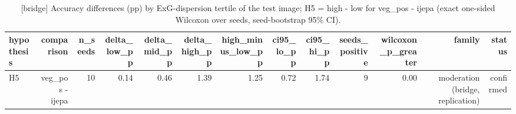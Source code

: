 \begin{table}[t]
\centering
\small
\caption{[bridge] Accuracy differences (pp) by ExG-dispersion tertile of the test image; H5 = high - low for veg\_pos - ijepa (exact one-sided Wilcoxon over seeds, seed-bootstrap 95\% CI).}
\label{tab:moderation}
\begin{tabular}{lrrrrrrrrrrrr}
\toprule
hypothesis & comparison & n\_seeds & delta\_low\_pp & delta\_mid\_pp & delta\_high\_pp & high\_minus\_low\_pp & ci95\_lo\_pp & ci95\_hi\_pp & seeds\_positive & wilcoxon\_p\_greater & family & status \\
\midrule
H5 & veg\_pos - ijepa & 10 & 0.14 & 0.46 & 1.39 & 1.25 & 0.72 & 1.74 & 9 & 0.00 & moderation (bridge, replication) & confirmed \\
\bottomrule
\end{tabular}
\end{table}
